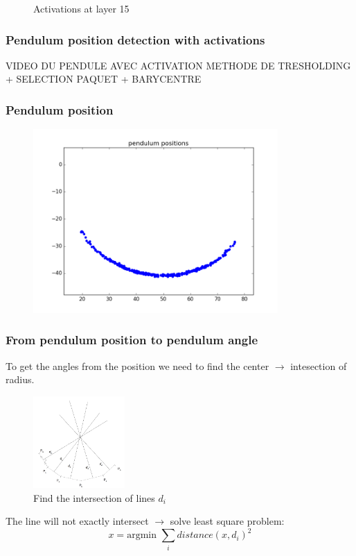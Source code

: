 \documentclass{beamer}
\begin{document}
\begin{frame}
\begin{figure}
\endminipage\hfill
  \caption{Activations at layer 15}
\end{figure}

\end{frame}

\begin{frame}
\frametitle{Pendulum position detection with activations}
VIDEO DU PENDULE AVEC ACTIVATION
METHODE DE TRESHOLDING + SELECTION PAQUET + BARYCENTRE
\end{frame}

\begin{frame}
  \frametitle{Pendulum position}
  \begin{figure}
    \includegraphics[height=7cm]{pendulum_positions.png}
  \end{figure}
\end{frame}

\begin{frame}
\frametitle{From pendulum position to pendulum angle}
To get the angles from the position we need to find the center $\rightarrow$ intesection of radius.
\begin{figure}
  \captionsetup{labelformat=empty}
  \includegraphics[height=3.5cm]{find_center.png}
  \caption{Find the intersection of lines $d_i$}
\end{figure}
The line will not exactly intersect $\rightarrow$ solve least square problem:
\[
  x = \text{argmin }\sum_i distance(x, d_i)^2
\]
\end{frame}
\end{document}
